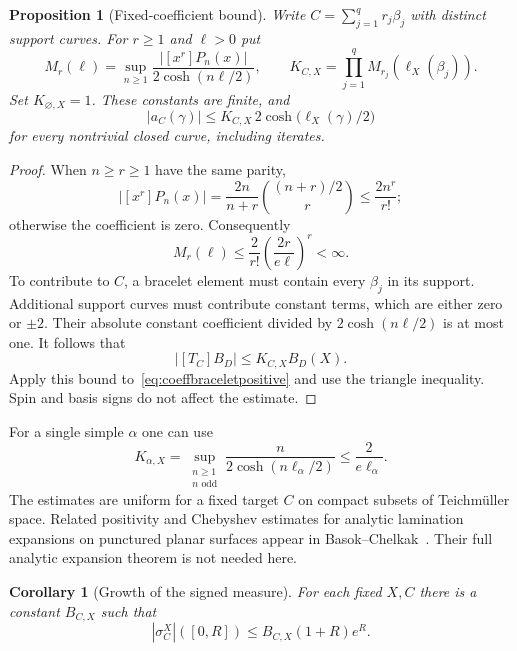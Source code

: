 \documentclass[11pt,a4paper]{article}
\numberwithin{equation}{section}
\newtheorem{proposition}[theorem]{Proposition}
\newtheorem{corollary}[theorem]{Corollary}
\theoremstyle{definition}
\theoremstyle{remark}
\begin{document}
\begin{proposition}[Fixed-coefficient bound]
\label{prop:coeffgrowth}
Write $C=\sum_{j=1}^q r_j\beta_j$ with distinct support curves.
For $r\geq1$ and $\ell>0$ put
\[
 M_r(\ell)=\sup_{n\geq1}
 \frac{|[x^r]P_n(x)|}{2\cosh(n\ell/2)},\qquad
 K_{C,X}=\prod_{j=1}^q M_{r_j}(\ell_X(\beta_j)).
\]
Set $K_{\varnothing,X}=1$. These constants are finite, and
\begin{equation}
 \boxed{
 |a_C(\gamma)|\leq
 K_{C,X}\,2\cosh\bigl(\ell_X(\gamma)/2\bigr)
 }
 \label{eq:coeffexponentialbound}
\end{equation}
for every nontrivial closed curve, including iterates.
\end{proposition}

\begin{proof}
When $n\geq r\geq1$ have the same parity,
\[
 |[x^r]P_n(x)|
 =\frac{2n}{n+r}\binom{(n+r)/2}{r}
 \leq\frac{2n^r}{r!};
\]
otherwise the coefficient is zero. Consequently
\begin{equation}
 M_r(\ell)\leq
 \frac{2}{r!}\left(\frac{2r}{e\ell}\right)^r<\infty.
 \label{eq:coeffMrbound}
\end{equation}
To contribute to $C$, a bracelet element must contain every
$\beta_j$ in its support. Additional support curves must contribute
constant terms, which are either zero or $\pm2$. Their absolute
constant coefficient divided by $2\cosh(n\ell/2)$ is at most one.
It follows that
\[
 |[T_C]B_D|\leq K_{C,X}B_D(X).
\]
Apply this bound to~\eqref{eq:coeffbraceletpositive} and use the
triangle inequality. Spin and basis signs do not affect the estimate.
\end{proof}

For a single simple $\alpha$ one can use
\[
 K_{\alpha,X}
 =\sup_{\substack{n\geq1\\n\text{ odd}}}
   \frac{n}{2\cosh(n\ell_\alpha/2)}
 \leq\frac{2}{e\ell_\alpha}.
\]
The estimates are uniform for a fixed target $C$ on compact subsets
of Teichm\"uller space. Related positivity and Chebyshev estimates
for analytic lamination expansions on punctured planar surfaces
appear in Basok--Chelkak~\cite[Section 4.4, Theorems 4.7 and 4.9]{BasokChelkak}. Their
full analytic expansion theorem is not needed here.

\begin{corollary}[Growth of the signed measure]
\label{cor:coeffmeasuregrowth}
For each fixed $X,C$ there is a constant $B_{C,X}$ such that
\begin{equation}
 |\sigma_C^X|([0,R])\leq B_{C,X}(1+R)e^R.
 \label{eq:coeffmeasuregrowth}
\end{equation}
\end{corollary}
\end{document}
